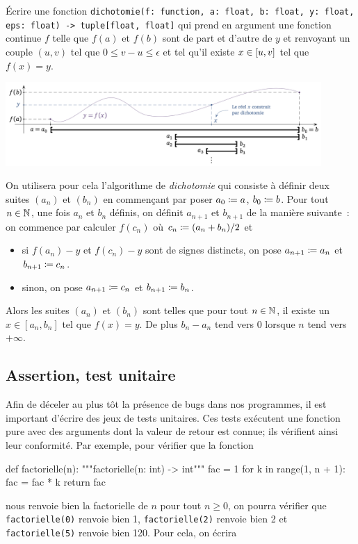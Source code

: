\documentclass{magnoliaold}
\begin{document}
\begin{exoUnique}
\exo Écrire une fonction
\verb_dichotomie(f: function, a: float, b: float, y: float, eps: float) -> tuple[float, float]_ qui prend en argument
une fonction continue $f$ telle que $f(a)$ et $f(b)$ sont de part et d'autre de $y$ et renvoyant un couple $(u,v)$ tel que $0\leq v-u\leq\epsilon$ et tel qu'il existe $x\in\left[u,v\right]$ tel que $f(x)=y$.\\
\begin{center}
  \includegraphics[width=0.9\textwidth]{../../commun/images/python-cours-dichotomie}
  \end{center}
On utilisera pour cela
l'algorithme de \emph{dichotomie} qui consiste à définir deux suites $(a_n)$ et $(b_n)$ en
commençant par poser $a_0\coloneqq a$, $b_0\coloneqq b$. Pour tout $n\in\mathbb{N}$, une fois $a_n$
et $b_n$ définis, on
définit $a_{n+1}$ et $b_{n+1}$ de la manière suivante~: on commence par calculer $f(c_n)$
où $c_n\coloneqq(a_n + b_n)/2$ et
\begin{itemize}
\item si $f(a_n)-y$ et $f(c_n)-y$ sont de signes distincts, on pose $a_{n+1}\coloneqq a_n$ et $b_{n+1}\coloneqq c_n$.
\item sinon, on pose $a_{n+1}\coloneqq c_n$ et $b_{n+1}\coloneqq b_n$.
\end{itemize}
Alors les suites $(a_n)$ et $(b_n)$ sont telles que pour tout $n\in\mathbb{N}$, il existe un
$x\in[a_n,b_n]$ tel que $f(x)=y$. De plus $b_n-a_n$ tend vers 0 lorsque $n$ tend vers $+\infty$.
\end{exoUnique}

\subsection{Assertion, test unitaire}

Afin de déceler au plus tôt la présence de bugs dans nos programmes, il est important
d'écrire des jeux de tests unitaires. Ces tests exécutent une fonction pure avec
des arguments dont la valeur de retour est connue; ils vérifient ainsi leur conformité. Par exemple,
pour vérifier que la fonction

\begin{pythoncodeline}
def factorielle(n):
    """factorielle(n: int) -> int"""
    fac = 1
    for k in range(1, n + 1):
        fac = fac * k
    return fac
\end{pythoncodeline}
\noindent nous renvoie bien la factorielle de $n$ pour tout $n\geq 0$,
on pourra vérifier que \verb!factorielle(0)! renvoie bien 1, \verb!factorielle(2)! renvoie bien 2 et
\verb!factorielle(5)! renvoie bien 120. Pour cela, on écrira
\end{document}
